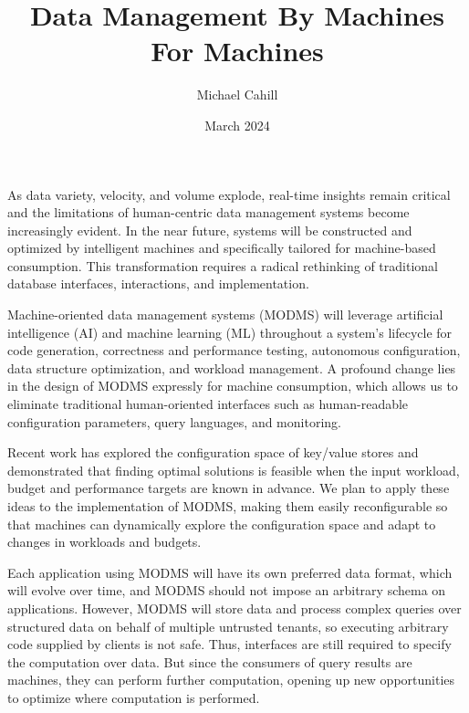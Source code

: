 \documentclass[acmsmall, nonacm]{acmart}
\begin{document}
\title{Data Management By Machines For Machines}
\author{Michael Cahill}

\date{March 2024}
\maketitle

As data variety, velocity, and volume explode, real-time insights remain critical and the limitations of human-centric data management systems become increasingly evident. In the near future, systems will be constructed and optimized by intelligent machines and specifically tailored for machine-based consumption. This transformation requires a radical rethinking of traditional database interfaces, interactions, and implementation.

Machine-oriented data management systems (MODMS) will leverage artificial intelligence (AI) and machine learning (ML) throughout a system's lifecycle for code generation, correctness and performance testing, autonomous configuration, data structure optimization, and workload management. A profound change lies in the design of MODMS expressly for machine consumption, which allows us to eliminate traditional human-oriented interfaces such as human-readable configuration parameters, query languages, and monitoring.

Recent work has explored the configuration space of key/value stores and demonstrated that finding optimal solutions is feasible when the input workload, budget and performance targets are known in advance. We plan to apply these ideas to the implementation of MODMS, making them easily reconfigurable so that machines can dynamically explore the configuration space and adapt to changes in workloads and budgets. 

Each application using MODMS will have its own preferred data format, which will evolve over time, and MODMS should not impose an arbitrary schema on applications. However, MODMS will store data and process complex queries over structured data on behalf of multiple untrusted tenants, so executing arbitrary code supplied by clients is not safe. Thus, interfaces are still required to specify the computation over data. But since the consumers of query results are machines, they can perform further computation, opening up new opportunities to optimize where computation is performed.
\end{document}
